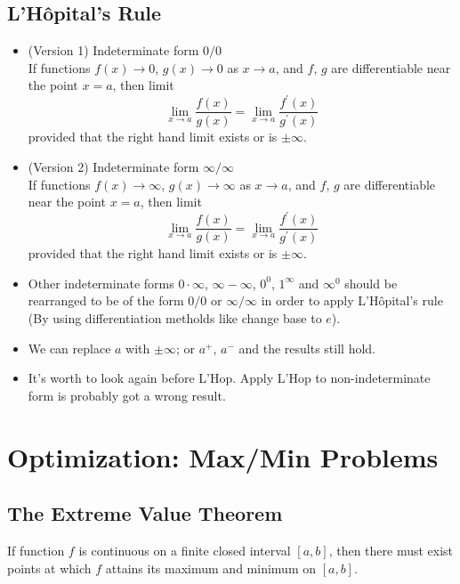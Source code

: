 \subsection{L'H\^opital's Rule}
\begin{itemize}
\item (Version 1) Indeterminate form $0/0$\\
  If functions $f(x)\to0$, $g(x)\to0$ as $x\to a$, and $f$, $g$ are differentiable near the point $x=a$, then limit
  \[\lim_{x\to a}\frac{f(x)}{g(x)}=\lim_{x\to a}\frac{f^\prime(x)}{g^\prime(x)}\]
  provided that the right hand limit exists or is $\pm\infty$.
\item (Version 2) Indeterminate form $\infty/\infty$\\
  If functions $f(x)\to\infty$, $g(x)\to\infty$ as $x\to a$, and $f$, $g$ are differentiable near the point $x=a$, then limit
  \[\lim_{x\to a}\frac{f(x)}{g(x)}=\lim_{x\to a}\frac{f^\prime(x)}{g^\prime(x)}\]
  provided that the right hand limit exists or is $\pm\infty$.
\item Other indeterminate forms $0\cdot\infty$, $\infty-\infty$, $0^0$, $1^\infty$ and $\infty^0$ should be rearranged to be of the form $0/0$ or $\infty/\infty$ in order to apply L'H\^opital's rule (By using differentiation metholds like change base to $e$).
\end{itemize}
\begin{note}
  \begin{itemize}\leavevmode
  \item We can replace $a$ with $\pm\infty$; or $a^+$, $a^-$ and the results still hold.
  \item It's worth to look again before L'Hop. Apply L'Hop to non-indeterminate form is probably got a wrong result.
  \end{itemize}
\end{note}

\section{Optimization: Max/Min Problems}
\subsection{The Extreme Value Theorem}
If function $f$ is continuous on a finite closed interval $[a,b]$, then there must exist points at which $f$ attains its maximum and minimum on $[a,b]$.

